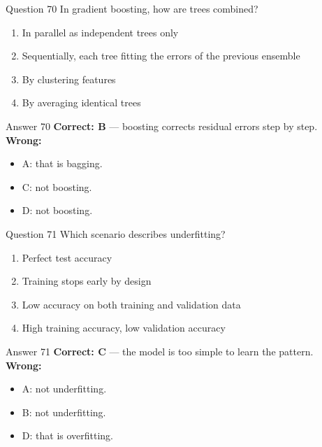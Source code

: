 \documentclass[aspectratio=169,11pt]{beamer}
\begin{document}
\begin{frame}{Question 70}
In gradient boosting, how are trees combined?
\begin{enumerate}[label=\Alph*.]
\item In parallel as independent trees only
\item Sequentially, each tree fitting the errors of the previous ensemble
\item By clustering features
\item By averaging identical trees
\end{enumerate}
\end{frame}
\begin{frame}{Answer 70}
\textbf{Correct: B} --- boosting corrects residual errors step by step.\\
\vspace{0.5em}
\textbf{Wrong:}
\begin{itemize}
\item A: that is bagging.
\item C: not boosting.
\item D: not boosting.
\end{itemize}
\end{frame}

\begin{frame}{Question 71}
Which scenario describes underfitting?
\begin{enumerate}[label=\Alph*.]
\item Perfect test accuracy
\item Training stops early by design
\item Low accuracy on both training and validation data
\item High training accuracy, low validation accuracy
\end{enumerate}
\end{frame}
\begin{frame}{Answer 71}
\textbf{Correct: C} --- the model is too simple to learn the pattern.\\
\vspace{0.5em}
\textbf{Wrong:}
\begin{itemize}
\item A: not underfitting.
\item B: not underfitting.
\item D: that is overfitting.
\end{itemize}
\end{frame}
\end{document}
